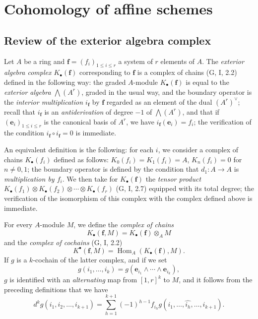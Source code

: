 \section{Cohomology of affine schemes}
\label{section:III.1}

\subsection{Review of the exterior algebra complex}
\label{subsection:III.1.1}

\begin{env}[1.1.1]
\label{III.1.1.1}
Let $A$ be a ring and $\mathbf f=(f_i)_{1\leq i\leq r}$ a system of $r$
elements of $A$. The \emph{exterior algebra complex
$K_\bullet(\mathbf f)$} corresponding to $\mathbf f$ is a complex of chains
(G, I, 2.2) defined in the following way: the graded $A$-module
$K_\bullet(\mathbf f)$ is equal to the \emph{exterior algebra
$\bigwedge(A^r)$}, graded in the usual way, and the boundary operator is the
\emph{interior multiplication $i_{\mathbf f}$} by $\mathbf f$ regarded as
an element of the dual $(A^r)^\vee$; recall that $i_{\mathbf f}$ is an
\emph{antiderivation} of degree $-1$ of $\bigwedge(A^r)$, and that if
$(\mathbf e_i)_{1\leq i\leq r}$ is the canonical basis of $A^r$, we have
$i_{\mathbf f}(\mathbf e_i)=f_i$; the verification of the condition
$i_{\mathbf f}\circ i_{\mathbf f}=0$ is immediate.

An equivalent definition is the following: for each $i$, we consider
a complex of chains $K_\bullet(f_i)$ defined as follows:
$K_0(f_i)=K_1(f_i)=A$, $K_n(f_i)=0$ for $n\neq0,1$; the boundary operator is
defined by the condition that $d_1:A\to A$ is \emph{multiplication by
$f_i$}. We then take for $K_\bullet(\mathbf f)$ the \emph{tensor product
$K_\bullet(f_1)\otimes K_\bullet(f_2)\otimes\cdots\otimes K_\bullet(f_r)$}
(G, I, 2.7) equipped with its total degree; the verification of the
isomorphism of this complex with the complex defined above is immediate.
\end{env}

\begin{env}[1.1.2]
\label{III.1.1.2}
For every $A$-module $M$, we define the \emph{complex of chains}
\begin{equation}
\label{III.1.1.2.1}
\tag{1.1.2.1}
K_\bullet(\mathbf f,M)=K_\bullet(\mathbf f)\otimes_A M
\end{equation}
and the \emph{complex of cochains} (G, I, 2.2)
\begin{equation}
\label{III.1.1.2.2}
\tag{1.1.2.2}
K^\bullet(\mathbf f,M)=\operatorname{Hom}_A(K_\bullet(\mathbf f),M).
\end{equation}
If $g$ is a $k$-cochain of the latter complex, and if we set
\[
g(i_1,\ldots,i_k)=g(\mathbf e_{i_1}\wedge\cdots\wedge\mathbf e_{i_k}),
\]
$g$ is identified with an \emph{alternating} map from $[1,r]^k$ to $M$, and
it follows from the preceding definitions that we have
\begin{equation}
\label{III.1.1.2.3}
\tag{1.1.2.3}
d^kg(i_1,i_2,\ldots,i_{k+1})=
\sum_{h=1}^{k+1}(-1)^{h-1}f_{i_h}
g(i_1,\ldots,\widehat{i_h},\ldots,i_{k+1}).
\end{equation}
\end{env}

